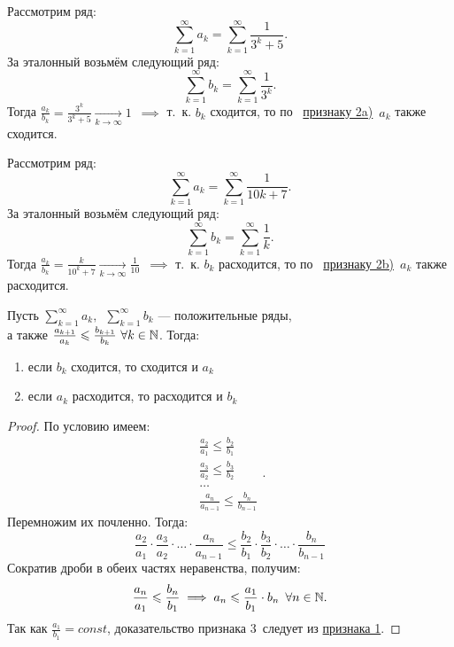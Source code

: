 \documentclass[../../main.tex]{subfiles}
\begin{document}
\begin{example}
	Рассмотрим ряд:
	\[
		 \sum\limits_{k = 1}^\infty a_k=  \sum\limits_{k = 1}^\infty\frac{1}{3^k + 5}
	.\]
	За эталонный возьмём следующий ряд:
	\[
		\sum\limits_{k = 1}^\infty b_k=   \sum\limits_{k = 1}^\infty\frac{1}{3^k}
	.\]
	Тогда $\frac{a_k}{b_k} = \frac{3^k}{3^k + 5} \xrightarrow[k \to \infty]{} 1$\ 
	$\implies$ т.~к. $b_k$ сходится, то по \  
	 \hyperref[lec26:comp_test_2]{признаку  2\textdegree a)}\ $a_k$ также 
	 сходится.
\end{example}
\begin{example}
	Рассмотрим ряд:
	\[
		 \sum\limits_{k = 1}^\infty a_k=  \sum\limits_{k = 1}^\infty\frac{1}{10k + 7}
	.\]
	За эталонный возьмём следующий ряд:
	\[
		\sum\limits_{k = 1}^\infty b_k=   \sum\limits_{k = 1}^\infty\frac{1}{k}
	.\]
	Тогда $\frac{a_k}{b_k} = \frac{k}{10^k + 7} \xrightarrow[k \to \infty]{} 
	\frac{1}{10}$\ 
	$\implies$ т.~к. $b_k$ расходится, то по \  
	 \hyperref[lec26:comp_test_2]{признаку  2\textdegree b)}\ 
	 $a_k$ также расходится.
\end{example}
\begin{thm}[Признак сравнения 3\textdegree]
 	\label{lec26:comp_test_3}
 	Пусть $\sum\limits_{k = 1}^\infty a_k,\enspace \sum\limits_{k = 1}^\infty 
 	b_k$
 	 --- положительные ряды,\\ 
 	а также $\frac{a_{k+1}}{a_k} \leq \frac{b_{k+1}}{b_k} \ 
 	\forall k \in \N$. Тогда:
	\begin{enumerate}[label={\alph*)}]
	\item если  $b_k$ сходится, то сходится и $a_k$
	\item если $a_k$ расходится, то расходится и $b_k$
	\end{enumerate}
\end{thm}
\begin{proof}
	По условию имеем:
 	\[
		\begin{array}{l}
			\frac{a_2}{a_1} \leq \frac{b_2}{b_1}\\
			\frac{a_3}{a_2} \leq \frac{b_3}{b_2}\\
			\dots\\
			\frac{a_n}{a_{n-1}} \leq \frac{b_n}{b_{n-1}}
		\end{array}		
	.\]
	Перемножим их почленно. Тогда:
	\[
		\frac{a_2}{a_1}\cdot\frac{a_3}{a_2}\cdot\ldots
		\cdot\frac{a_n}{a_{n-1}} \leq
		\frac{b_2}{b_1}\cdot\frac{b_3}{b_2}\cdot\ldots
		\cdot\frac{b_n}{b_{n-1}}
	\]
	Сократив дроби в обеих частях неравенства, получим:
	\[
		\frac{a_n}{a_1} \leqslant \frac{b_n}{b_1} \implies
		a_n \leqslant \frac{a_1}{b_1}\cdot b_n\enspace \forall n \in \mathbb{N}
	.\]
	Так как $ \frac{a_1}{b_1} = const$, 
	доказательство признака 3\textdegree \ следует из
	\hyperref[lec26:comp_test_1]{признака  1\textdegree}.
\end{proof}
\end{document}
